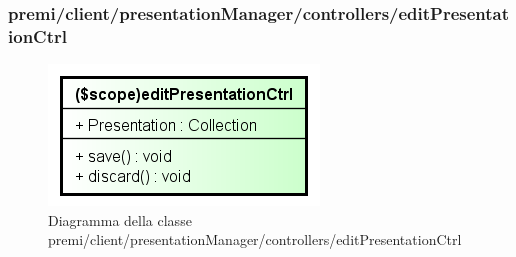 \subsubsection{premi/client/presentationManager/controllers/editPresentationCtrl}
\begin{figure}[h]
\begin{center}
\includegraphics[scale=0.90]{img/diacla/editPresentationCtrl.png}
\caption{Diagramma della classe premi/client/presentationManager/controllers/editPresentationCtrl}
\end{center}
\end{figure}

